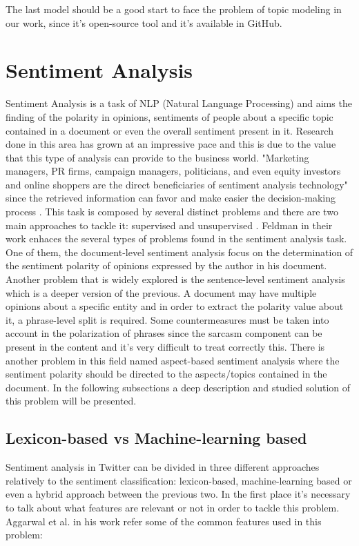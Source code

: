 The last model should be a good start to face the problem of topic modeling in our work, since it's open-source tool and it's available in GitHub.

\section{Sentiment Analysis}
Sentiment Analysis is a task of NLP (Natural Language Processing) and aims the finding of the polarity in opinions, sentiments of people about a specific topic contained in a document or even the overall sentiment present in it. Research done in this area has grown at an impressive pace and this is due to the value that this type of analysis can provide to the business world. "Marketing managers, PR firms, campaign managers, politicians, and even equity investors and online shoppers are the direct beneficiaries of sentiment analysis technology" since the retrieved information can favor and make easier the decision-making process \cite{kn:Feldman:2013}. This task is composed by several distinct problems and there are two main approaches to tackle it: supervised \cite{kn:Saleiro2016, kn:Kouloumpis2011} and unsupervised \cite{kn:Musto2015, kn:Allisio2013}. Feldman in their work \cite{kn:Feldman:2013} enhaces the several types of problems found in the sentiment analysis task. One of them, the document-level sentiment analysis focus on the determination of the sentiment polarity of opinions expressed by the author in his document. Another problem that is widely explored is the sentence-level sentiment analysis which is a deeper version of the previous. A document may have multiple opinions about a specific entity and in order to extract the polarity value about it, a phrase-level split is required. Some countermeasures must be taken into account in the polarization of phrases since the sarcasm component can be present in the content and it's very difficult to treat correctly this. There is another problem in this field named aspect-based sentiment analysis where the sentiment polarity should be directed to the aspects/topics contained in the document. In the following subsections a deep description and studied solution of this problem will be presented.

\subsection{Lexicon-based vs Machine-learning based} \label{subsec:lexi_mach}
Sentiment analysis in Twitter can be divided in three different approaches relatively to the sentiment classification: lexicon-based, machine-learning based or even a hybrid approach between the previous two. In the first place it's necessary to talk about what features are relevant or not in order to tackle this problem. Aggarwal et al. \cite{kn:Aggarwal2012} in his work refer some of the common features used in this problem:


